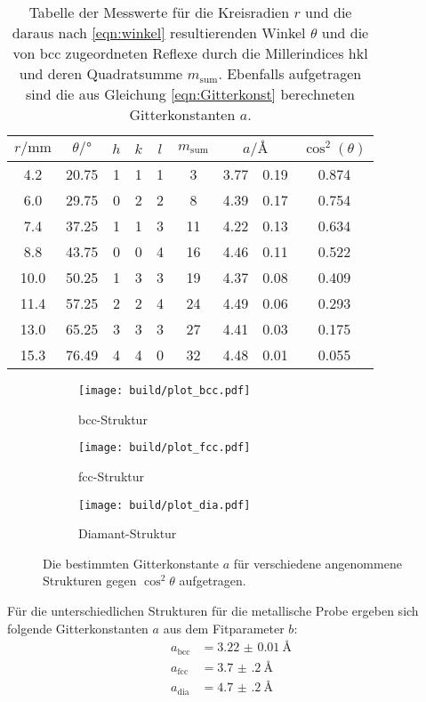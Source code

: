 \begin{table}
\centering
\caption{Tabelle der Messwerte für die Kreisradien $r$ und die daraus nach \ref{eqn:winkel} resultierenden Winkel $\theta$
    und die von bcc zugeordneten Reflexe durch die Millerindices hkl und deren Quadratsumme $m_\mathrm{sum}$.
    Ebenfalls aufgetragen sind die
    aus Gleichung \eqref{eqn:Gitterkonst} berechneten Gitterkonstanten $a$.}
  \label{tab:dia}
\begin{tabular}{S S c c c c S[table-format=1.2]@{${}\pm{}$} S[table-format=1.2] S[table-format=1.3]  }
\toprule
$r/\si{\milli\meter}$ & $\theta / \si{\degree}$ &$h$ & $k$ & $l$ & $m_\mathrm{sum}$ & 
&  {$\cos^2\left(\theta\right)$} \\
 	&	20.75	&	1	&	1	&	1	&	3	  &	3.77	&	0.19	&	0.874   \\
6.0 	&	29.75	&	0	&	2	&	2	&	8  	&	4.39  &	0.17	&	0.754   \\
7.4 	&	37.25	&	1	&	1	&	3	&	11	&	4.22  &	0.13 	&	0.634   \\
8.8 	&	43.75	&	0	&	0	&	4	&	16  &	4.46  &	0.11	&	0.522   \\
10.0	&	50.25	&	1	&	3	&	3	&	19	&	4.37	&	0.08	&	0.409   \\
11.4	&	57.25	&	2	&	2	&	4	&	24	&	4.49	&	0.06	&	0.293   \\
13.0	&	65.25	&	3	&	3	&	3	&	27	&	4.41	&	0.03	&	0.175   \\
15.3	&	76.49	&	4	&	4	&	0	&	32	&	4.48	&	0.01	&	0.055   \\
\bottomrule
\end{tabular}
\end{table}


\begin{figure}[hhh]
  \centering
  \begin{subfigure}{0.7\textwidth}
    \centering
    \texttt{[image: build/plot\_bcc.pdf]}
    \caption{bcc-Struktur}
    \label{subfig:bcc}
  \end{subfigure}
  \begin{subfigure}{.49\textwidth}
    \centering
    \texttt{[image: build/plot\_fcc.pdf]}
    \caption{fcc-Struktur}
    \label{subfig:fcc}
  \end{subfigure}
  \begin{subfigure}{.49\textwidth}
    \centering
    \texttt{[image: build/plot\_dia.pdf]}
    \caption{Diamant-Struktur}
    \label{subfig:dia}
  \end{subfigure}
  \caption{Die bestimmten Gitterkonstante $a$ für verschiedene angenommene Strukturen gegen $\cos^2\theta$ aufgetragen.}
  \label{fig:metall}
\end{figure}
\FloatBarrier
Für die unterschiedlichen Strukturen für die metallische Probe ergeben sich folgende Gitterkonstanten $a$
aus dem Fitparameter $b$:
\begin{align*}
a_\mathrm{bcc}&=\SI{3.22(1)}{\angstrom}\\
a_\mathrm{fcc}&=\SI{3.7(2)}{\angstrom}\\
a_\mathrm{dia}&=\SI{4.7(2)}{\angstrom}
\end{align*}



